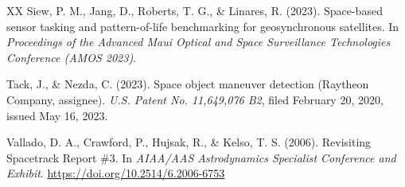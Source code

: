 \documentclass[11pt]{article}
\begin{document}
\begin{thebibliography}{XX}
 Siew, P. M., Jang, D., Roberts, T. G., \& Linares, R. (2023). Space-based sensor tasking and pattern-of-life benchmarking for geosynchronous satellites. In \emph{Proceedings of the Advanced Maui Optical and Space Surveillance Technologies Conference (AMOS 2023)}.

 Tack, J., \& Nezda, C. (2023). Space object maneuver detection (Raytheon Company, assignee). \emph{U.S. Patent No. 11,649,076 B2}, filed February 20, 2020, issued May 16, 2023.

 Vallado, D. A., Crawford, P., Hujsak, R., \& Kelso, T. S. (2006). Revisiting Spacetrack Report \#3. In \emph{AIAA/AAS Astrodynamics Specialist Conference and Exhibit}. \url{https://doi.org/10.2514/6.2006-6753}


\end{thebibliography}
\end{document}
